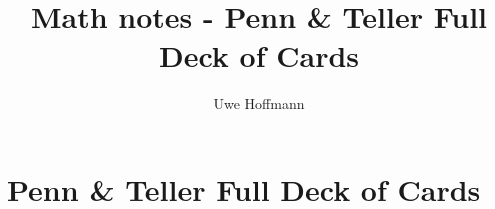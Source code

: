 

\title{Math notes - Penn \& Teller Full Deck of Cards}
\author{Uwe Hoffmann}




\setcounter{chapter}{1}
\chapter*{Penn \& Teller Full Deck of Cards}
